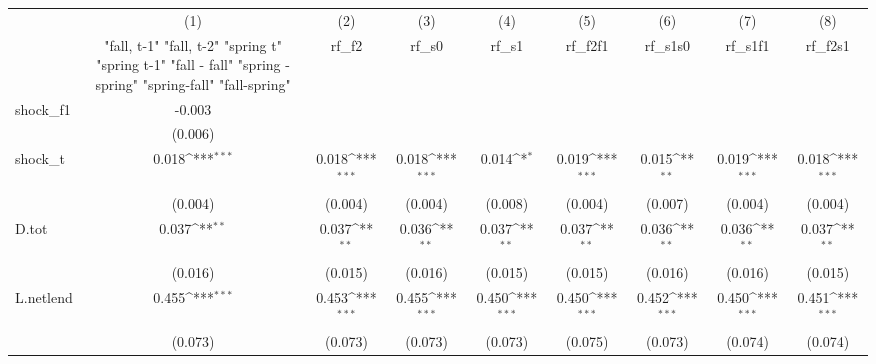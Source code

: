 {
\def\sym#1{\ifmmode^{#1}\else\(^{#1}\)\fi}
\begin{tabular}{l*{8}{c}}
\toprule
            &\multicolumn{1}{c}{(1)}&\multicolumn{1}{c}{(2)}&\multicolumn{1}{c}{(3)}&\multicolumn{1}{c}{(4)}&\multicolumn{1}{c}{(5)}&\multicolumn{1}{c}{(6)}&\multicolumn{1}{c}{(7)}&\multicolumn{1}{c}{(8)}\\
            &\multicolumn{1}{c}{  "fall, t-1" "fall, t-2" "spring t" "spring t-1"  "fall - fall" "spring - spring" "spring-fall" "fall-spring" }&\multicolumn{1}{c}{rf\_f2}&\multicolumn{1}{c}{rf\_s0}&\multicolumn{1}{c}{rf\_s1}&\multicolumn{1}{c}{rf\_f2f1}&\multicolumn{1}{c}{rf\_s1s0}&\multicolumn{1}{c}{rf\_s1f1}&\multicolumn{1}{c}{rf\_f2s1}\\
\midrule
shock\_f1    &      -0.003         &                     &                     &                     &                     &                     &                     &                     \\
            &     (0.006)         &                     &                     &                     &                     &                     &                     &                     \\
\addlinespace
shock\_t     &       0.018\sym{***}&       0.018\sym{***}&       0.018\sym{***}&       0.014\sym{*}  &       0.019\sym{***}&       0.015\sym{**} &       0.019\sym{***}&       0.018\sym{***}\\
            &     (0.004)         &     (0.004)         &     (0.004)         &     (0.008)         &     (0.004)         &     (0.007)         &     (0.004)         &     (0.004)         \\
\addlinespace
D.tot       &       0.037\sym{**} &       0.037\sym{**} &       0.036\sym{**} &       0.037\sym{**} &       0.037\sym{**} &       0.036\sym{**} &       0.036\sym{**} &       0.037\sym{**} \\
            &     (0.016)         &     (0.015)         &     (0.016)         &     (0.015)         &     (0.015)         &     (0.016)         &     (0.016)         &     (0.015)         \\
\addlinespace
L.netlend   &       0.455\sym{***}&       0.453\sym{***}&       0.455\sym{***}&       0.450\sym{***}&       0.450\sym{***}&       0.452\sym{***}&       0.450\sym{***}&       0.451\sym{***}\\
            &     (0.073)         &     (0.073)         &     (0.073)         &     (0.073)         &     (0.075)         &     (0.073)         &     (0.074)         &     (0.074)         \\

\end{tabular}}
